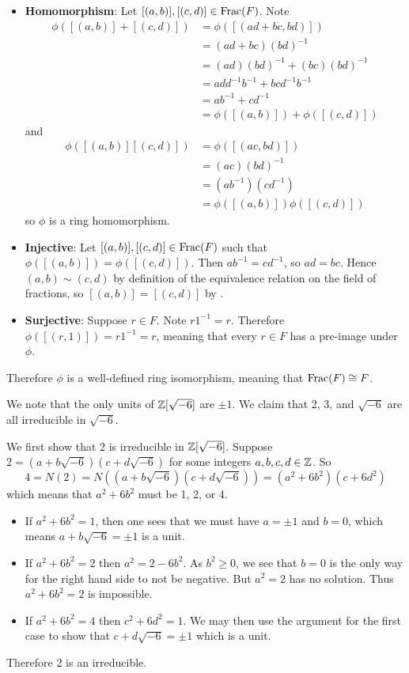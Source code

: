 \begin{questions}
\begin{itemize}
        \item \textbf{Homomorphism}: Let $[(a,b)], [(c,d)] \in \mathrm{Frac}(F)$. Note
        \begin{align*}
            \phi([(a,b)] + [(c,d)]) &= \phi([(ad+bc, bd)])\\
            &= (ad+bc)(bd)^{-1}\\
            &= (ad)(bd)^{-1} + (bc)(bd)^{-1}\\
            &= add^{-1}b^{-1} + bcd^{-1}b^{-1}\\
            &= ab^{-1} + cd^{-1}\\
            &= \phi([(a,b)]) + \phi([(c,d)])
        \end{align*}
        and
        \begin{align*}
            \phi([(a,b)][(c,d)]) &= \phi([(ac,bd)])\\
            &= (ac)(bd)^{-1}\\
            &= (ab^{-1})(cd^{-1})\\
            &= \phi([(a,b)])\phi([(c,d)])
        \end{align*}
        so $\phi$ is a ring homomorphism.

        \item \textbf{Injective}: Let $[(a,b)], [(c,d)] \in \mathrm{Frac}(F)$ such that $\phi([(a,b)]) = \phi([(c,d)])$. Then $ab^{-1} = cd^{-1}$, so $ad = bc$. Hence $(a,b) \mathrel{\sim} (c,d)$ by definition of the equivalence relation on the field of fractions, so $[(a,b)] = [(c,d)]$ by .

        \item \textbf{Surjective}: Suppose $r \in F$. Note $r1^{-1} = r$. Therefore $\phi([(r, 1)]) = r1^{-1} = r$, meaning that every $r \in F$ has a pre-image under $\phi$.
    \end{itemize}
    Therefore $\phi$ is a well-defined ring isomorphism, meaning that $\mathrm{Frac}(F) \cong F$.

    \item We note that the only units of $\mathbb{Z}[\sqrt{-6}]$ are $\pm1$. We claim that 2, 3, and $\sqrt{-6}$ are all irreducible in $\sqrt{-6}$.

    We first show that 2 is irreducible in $\mathbb{Z}[\sqrt{-6}]$. Suppose $2 = (a+b\sqrt{-6})(c+d\sqrt{-6})$ for some integers $a,b,c,d\in \mathbb{Z}$. So
    \[
        4 = N(2) = N((a+b\sqrt{-6})(c+d\sqrt{-6})) = (a^2+6b^2)(c+6d^2)
    \]
    which means that $a^2+6b^2$ must be 1, 2, or 4.
    \begin{itemize}
        \item If $a^2+6b^2 = 1$, then one sees that we must have $a = \pm1$ and $b = 0$, which means $a+b\sqrt{-6} = \pm1$ is a unit.
        \item If $a^2+6b^2 = 2$ then $a^2 = 2 - 6b^2$. As $b^2 \geq 0$, we see that $b = 0$ is the only way for the right hand side to not be negative. But $a^2 = 2$ has no solution. Thus $a^2+6b^2 = 2$ is impossible.
        \item If $a^2+6b^2 = 4$ then $c^2+6d^2 = 1$. We may then use the argument for the first case to show that $c+d\sqrt{-6} = \pm1$ which is a unit.
    \end{itemize}
    Therefore 2 is an irreducible.


\end{questions}
